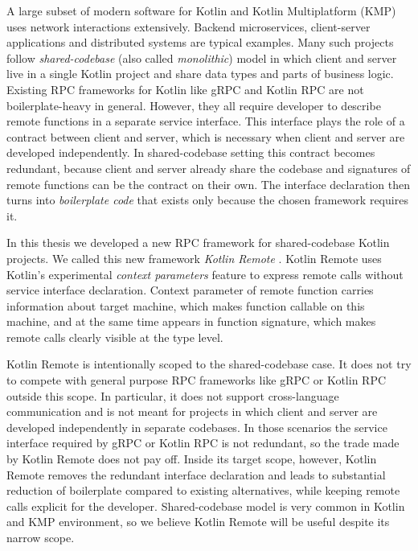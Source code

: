 \documentclass[a4paper,11pt,oneside]{article}
\newcommand{\term}[1]{\textit{#1}}
\begin{document}
A large subset of modern software for Kotlin and Kotlin Multiplatform (KMP) uses network
interactions extensively. Backend microservices, client-server applications and distributed
systems are typical examples. Many such projects follow \term{shared-codebase} (also called
\term{monolithic}) model in which client and server live in a single Kotlin project and share
data types and parts of business logic. Existing RPC frameworks for Kotlin like gRPC and Kotlin
RPC are not boilerplate-heavy in general. However, they all require developer to describe remote
functions in a separate service interface. This interface plays the role of a contract between
client and server, which is necessary when client and server are developed independently. In
shared-codebase setting this contract becomes redundant, because client and server already share
the codebase and signatures of remote functions can be the contract on their own. The interface
declaration then turns into \term{boilerplate code} that exists only because the chosen framework
requires it.

In this thesis we developed a new RPC framework for shared-codebase Kotlin projects. We called
this new framework \term{Kotlin Remote} \cite{enotvtapke_kotlin-remote_2026}. Kotlin Remote uses Kotlin's experimental \term{context
parameters} feature to express remote calls without service interface declaration. Context
parameter of remote function carries information about target machine, which makes function
callable on this machine, and at the same time appears in function signature, which makes remote
calls clearly visible at the type level.

Kotlin Remote is intentionally scoped to the shared-codebase case. It does not try to compete
with general purpose RPC frameworks like gRPC or Kotlin RPC outside this scope. In particular,
it does not support cross-language communication and is not meant for projects in which client
and server are developed independently in separate codebases. In those scenarios the service
interface required by gRPC or Kotlin RPC is not redundant, so the trade made by Kotlin Remote
does not pay off. Inside its target scope, however, Kotlin Remote removes the redundant interface
declaration and leads to substantial reduction of boilerplate compared to existing alternatives,
while keeping remote calls explicit for the developer. Shared-codebase model is very common
in Kotlin and KMP environment, so we believe Kotlin Remote will be useful despite its narrow
scope.


\newpage
\tableofcontents
\end{document}
